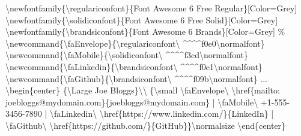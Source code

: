 \documentclass[
  british,
  a4paper,
  rgb,
  dvipsnames,
  svgnames,
  hyphens]{article}
\newenvironment{Shaded}{\begin{snugshade}}{\end{snugshade}}
\newcommand{\CommentTok}[1]{\textcolor[rgb]{0.50,0.62,0.50}{#1}}
\newcommand{\ExtensionTok}[1]{\textcolor[rgb]{0.80,0.80,0.80}{#1}}
\newcommand{\FunctionTok}[1]{\textcolor[rgb]{0.94,0.94,0.56}{#1}}
\newcommand{\KeywordTok}[1]{\textcolor[rgb]{0.94,0.87,0.69}{#1}}
\newcommand{\NormalTok}[1]{\textcolor[rgb]{0.80,0.80,0.80}{#1}}
\begin{document}
\begin{Shaded}
\begin{Highlighting}[]
\FunctionTok{\textbackslash{}newfontfamily}\NormalTok{\{}\FunctionTok{\textbackslash{}regulariconfont}\NormalTok{\}\{Font Awesome 6 Free Regular\}[Color=Grey]}
\FunctionTok{\textbackslash{}newfontfamily}\NormalTok{\{}\FunctionTok{\textbackslash{}solidiconfont}\NormalTok{\}\{Font Awesome 6 Free Solid\}[Color=Grey]}
\FunctionTok{\textbackslash{}newfontfamily}\NormalTok{\{}\FunctionTok{\textbackslash{}brandsiconfont}\NormalTok{\}\{Font Awesome 6 Brands\}[Color=Grey]}
\CommentTok{\%}
\FunctionTok{\textbackslash{}newcommand}\NormalTok{\{}\ExtensionTok{\textbackslash{}faEnvelope}\NormalTok{\}\{}\FunctionTok{\textbackslash{}regulariconfont\textbackslash{} }\NormalTok{\^{}\^{}\^{}\^{}f0e0}\FunctionTok{\textbackslash{}normalfont}\NormalTok{\}}
\FunctionTok{\textbackslash{}newcommand}\NormalTok{\{}\ExtensionTok{\textbackslash{}faMobile}\NormalTok{\}\{}\FunctionTok{\textbackslash{}solidiconfont\textbackslash{} }\NormalTok{\^{}\^{}\^{}\^{}f3cd}\FunctionTok{\textbackslash{}normalfont}\NormalTok{\}}
\FunctionTok{\textbackslash{}newcommand}\NormalTok{\{}\ExtensionTok{\textbackslash{}faLinkedin}\NormalTok{\}\{}\FunctionTok{\textbackslash{}brandsiconfont\textbackslash{} }\NormalTok{\^{}\^{}\^{}\^{}f0e1}\FunctionTok{\textbackslash{}normalfont}\NormalTok{\}}
\FunctionTok{\textbackslash{}newcommand}\NormalTok{\{}\ExtensionTok{\textbackslash{}faGithub}\NormalTok{\}\{}\FunctionTok{\textbackslash{}brandsiconfont\textbackslash{} }\NormalTok{\^{}\^{}\^{}\^{}f09b}\FunctionTok{\textbackslash{}normalfont}\NormalTok{\}}
\NormalTok{...}
\KeywordTok{\textbackslash{}begin}\NormalTok{\{}\ExtensionTok{center}\NormalTok{\}}
\NormalTok{\{}\FunctionTok{\textbackslash{}Large}\NormalTok{ Joe Bloggs\}}\FunctionTok{\textbackslash{}\textbackslash{}}
\NormalTok{\{}\FunctionTok{\textbackslash{}small} \FunctionTok{\textbackslash{}faEnvelope\textbackslash{} \textbackslash{}href}\NormalTok{\{mailto: joebloggs@mydomain.com\}\{joebloggs@mydomain.com\} | }\FunctionTok{\textbackslash{}faMobile\textbackslash{} }\NormalTok{+1{-}555{-}3456{-}7890 | }\FunctionTok{\textbackslash{}faLinkedin\textbackslash{} \textbackslash{}href}\NormalTok{\{https://www.linkedin.com/\}\{LinkedIn\} | }\FunctionTok{\textbackslash{}faGithub\textbackslash{} \textbackslash{}href}\NormalTok{\{https://github.com/\}\{GitHub\}\}}\FunctionTok{\textbackslash{}normalsize}
\KeywordTok{\textbackslash{}end}\NormalTok{\{}\ExtensionTok{center}\NormalTok{\}}
\end{Highlighting}
\end{Shaded}
\end{document}
